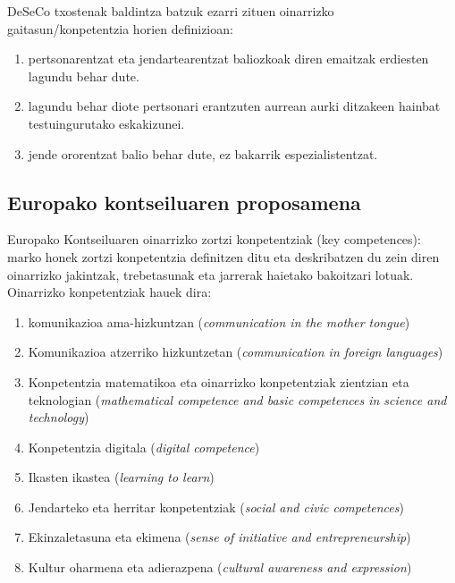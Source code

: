 \documentclass[
]{book}
\providecommand{\tightlist}{%
  \setlength{\itemsep}{0pt}\setlength{\parskip}{0pt}}
\begin{document}
DeSeCo txostenak baldintza batzuk ezarri zituen oinarrizko gaitasun/konpetentzia horien definizioan:

\begin{enumerate}
\def\labelenumi{\alph{enumi})}
\tightlist
\item
  pertsonarentzat eta jendartearentzat baliozkoak diren emaitzak erdiesten lagundu behar dute.
\item
  lagundu behar diote pertsonari erantzuten aurrean aurki ditzakeen hainbat testuingurutako eskakizunei.
\item
  jende ororentzat balio behar dute, ez bakarrik espezialistentzat.
\end{enumerate}

\hypertarget{europako-kontseiluaren-proposamena}{%
\subsection{Europako kontseiluaren proposamena}\label{europako-kontseiluaren-proposamena}}

Europako Kontseiluaren oinarrizko zortzi konpetentziak (key competences): marko honek zortzi konpetentzia definitzen ditu eta deskribatzen du zein diren oinarrizko jakintzak, trebetasunak eta jarrerak haietako bakoitzari lotuak. Oinarrizko konpetentziak hauek dira:

\begin{enumerate}
\def\labelenumi{\arabic{enumi}.}
\tightlist
\item
  komunikazioa ama-hizkuntzan (\emph{communication in the mother tongue})
\item
  Komunikazioa atzerriko hizkuntzetan (\emph{communication in foreign languages})
\item
  Konpetentzia matematikoa eta oinarrizko konpetentziak zientzian eta teknologian (\emph{mathematical competence and basic competences in science and technology})
\item
  Konpetentzia digitala (\emph{digital competence})
\item
  Ikasten ikastea (\emph{learning to learn})
\item
  Jendarteko eta herritar konpetentziak (\emph{social and civic competences})
\item
  Ekinzaletasuna eta ekimena (\emph{sense of initiative and entrepreneurship})
\item
  Kultur oharmena eta adierazpena (\emph{cultural awareness and expression})
\end{enumerate}
\end{document}
